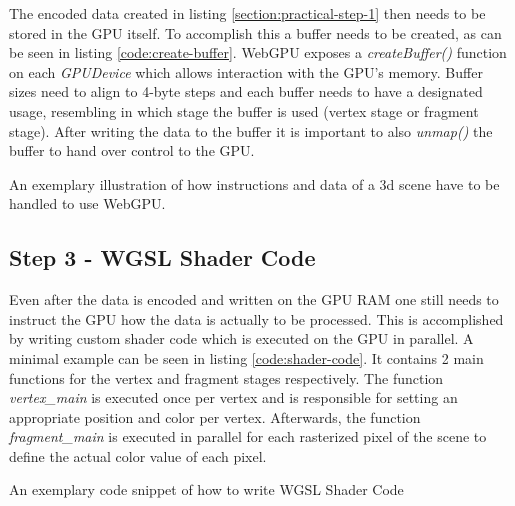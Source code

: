 The encoded data created in listing \ref*{section:practical-step-1} then needs to be stored in the GPU itself. To accomplish this a buffer needs to be created, as can be seen in listing \ref*{code:create-buffer}. 
WebGPU exposes a \emph{createBuffer()} function on each \emph{GPUDevice} which allows interaction with the GPU's memory. Buffer sizes need to align to 4-byte steps and each buffer needs to 
have a designated usage, resembling in which stage the buffer is used (vertex stage or fragment stage). After writing the data to the buffer it is important to also \emph{unmap()} the buffer 
to hand over control to the GPU. 

\begin{listing}
  \centering

  \caption[Code Snippet: createBuffer]
  {
    An exemplary illustration of how instructions and data of a 3d scene have to be handled
    to use WebGPU.
  }
  \label{code:create-buffer}
\end{listing}


\subsection{Step 3 - WGSL Shader Code}
\label{section:shader-code}

Even after the data is encoded and written on the GPU RAM one still needs to instruct the GPU how the data is actually to be processed. This is accomplished by writing custom
shader code which is executed on the GPU in parallel. A minimal example can be seen in listing \ref*{code:shader-code}.  It contains 2 main functions for the vertex and fragment stages respectively. 
The function \emph{vertex\_main} is executed once per vertex and is responsible for setting an appropriate position and color per vertex. Afterwards, the function \emph{fragment\_main} is 
executed in parallel for each rasterized pixel of the scene to define the actual color value of each pixel. 

\begin{listing}

  \centering

  \caption[Code Snippet: WebGPU Shader Code]
  {
    An exemplary code snippet of how to write WGSL Shader Code
  }
  \label{code:shader-code}
\end{listing}

